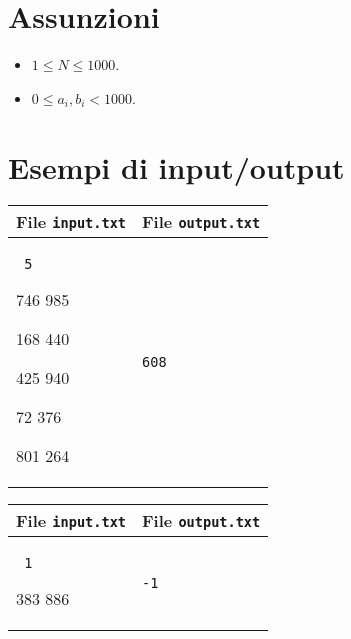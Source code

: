 \documentclass[a4paper,11pt]{article}
\newcommand{\file}[1]{\texttt{#1}}
\newcommand{\esempio}[2]{
\noindent\begin{minipage}{\textwidth}
\begin{tabular}{|p{11cm}|p{5cm}|}
    \hline
    \textbf{File \file{input.txt}} & \textbf{File \file{output.txt}}\\
    \hline
    \tt \small #1 &
    \tt \small #2 \\
    \hline
\end{tabular}
\end{minipage}
}
\begin{document}
\section*{Assunzioni}
\begin{itemize}
\item $1 \le N \le 1000$.
\item $0 \le a_i, b_i < 1000$.
\end{itemize}

\section*{Esempi di input/output}
\setlength{\tabcolsep}{6pt}
\esempio{
5

746 985

168 440

425 940

72 376

801 264
}{608}

\esempio{
1

383 886
}{-1}
\end{document}
